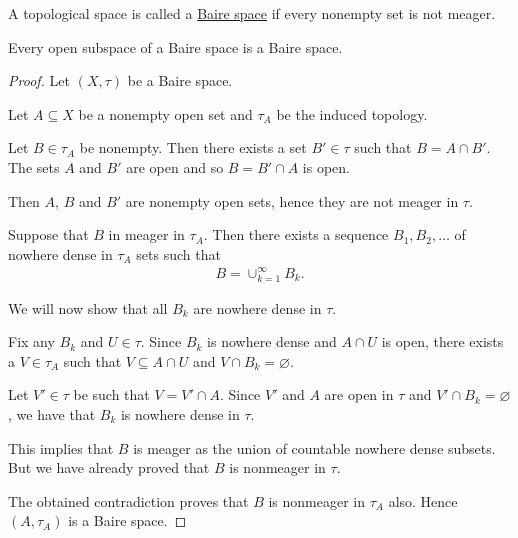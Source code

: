\begin{definition}\label{def:baire_space}
  A topological space is called a \uline{Baire space} if every nonempty set is not meager.
\end{definition}

\begin{proposition}\label{thm:open_subspace_of_baire_space_is_baire}
  Every open subspace of a Baire space is a Baire space.
\end{proposition}
\begin{proof}
  Let $(X, \tau)$ be a Baire space.

  Let $A \subseteq X$ be a nonempty open set and $\tau_A$ be the induced topology.

  Let $B \in \tau_A$ be nonempty. Then there exists a set $B' \in \tau$ such that $B = A \cap B'$. The sets $A$ and $B'$ are open and so $B = B' \cap A$ is open.

  Then $A$, $B$ and $B'$ are nonempty open sets, hence they are not meager in $\tau$.

  Suppose that $B$ in meager in $\tau_A$. Then there exists a sequence $B_1, B_2, \ldots$ of nowhere dense in $\tau_A$ sets such that
  \begin{align*}
    B = \cup_{k=1}^\infty B_k.
  \end{align*}

  We will now show that all $B_k$ are nowhere dense in $\tau$.

  Fix any $B_k$ and $U \in \tau$. Since $B_k$ is nowhere dense and $A \cap U$ is open, there exists a $V \in \tau_A$ such that $V \subseteq A \cap U$ and $V \cap B_k = \varnothing$.

  Let $V' \in \tau$ be such that $V = V' \cap A$. Since $V'$ and $A$ are open in $\tau$ and $V' \cap B_k = \varnothing$, we have that $B_k$ is nowhere dense in $\tau$.

  This implies that $B$ is meager as the union of countable nowhere dense subsets. But we have already proved that $B$ is nonmeager in $\tau$.

  The obtained contradiction proves that $B$ is nonmeager in $\tau_A$ also. Hence $(A, \tau_A)$ is a Baire space.
\end{proof}
